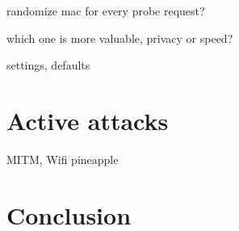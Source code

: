 \documentclass[12pt,a4paper,oneside,pdftex]{report}
\begin{document}
randomize mac for every probe request?

which one is more valuable, privacy or speed?

settings, defaults

\chapter{Active attacks}
\label{chapter:attacks}

MITM, Wifi pineapple

\chapter{Conclusion}
\label{chapter:conclusion}


% 





\end{document}
